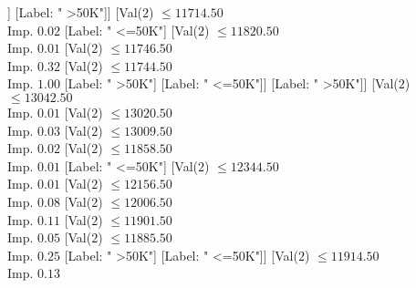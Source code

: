 \documentclass[margin=10pt]{standalone}
\begin{document}
\begin{forest}
																				[Val($2$) $ \leq 14291.50$ \\ Imp. $0.01$
																					[Val($2$) $ \leq 13303.50$ \\ Imp. $0.01$
																						[Val($2$) $ \leq 13104.50$ \\ Imp. $0.02$
																							[Val($2$) $ \leq 11669.50$ \\ Imp. $0.01$
																								[Val($2$) $ \leq 11513.50$ \\ Imp. $0.11$
																									[Val($2$) $ \leq 11498.50$ \\ Imp. $0.31$
																										[Label: " >50K"]
																										[Label: " <=50K"]]
																									[Label: " >50K"]]
																								[Val($2$) $ \leq 11714.50$ \\ Imp. $0.02$
																									[Label: " <=50K"]
																									[Val($2$) $ \leq 11820.50$ \\ Imp. $0.01$
																										[Val($2$) $ \leq 11746.50$ \\ Imp. $0.32$
																											[Val($2$) $ \leq 11744.50$ \\ Imp. $1.00$
																												[Label: " >50K"]
																												[Label: " <=50K"]]
																											[Label: " >50K"]]
																										[Val($2$) $ \leq 13042.50$ \\ Imp. $0.01$
																											[Val($2$) $ \leq 13020.50$ \\ Imp. $0.03$
																												[Val($2$) $ \leq 13009.50$ \\ Imp. $0.02$
																													[Val($2$) $ \leq 11858.50$ \\ Imp. $0.01$
																														[Label: " <=50K"]
																														[Val($2$) $ \leq 12344.50$ \\ Imp. $0.01$
																															[Val($2$) $ \leq 12156.50$ \\ Imp. $0.08$
																																[Val($2$) $ \leq 12006.50$ \\ Imp. $0.11$
																																	[Val($2$) $ \leq 11901.50$ \\ Imp. $0.05$
																																		[Val($2$) $ \leq 11885.50$ \\ Imp. $0.25$
																																			[Label: " >50K"]
																																			[Label: " <=50K"]]
																																		[Val($2$) $ \leq 11914.50$ \\ Imp. $0.13$

\end{forest}
\end{document}
